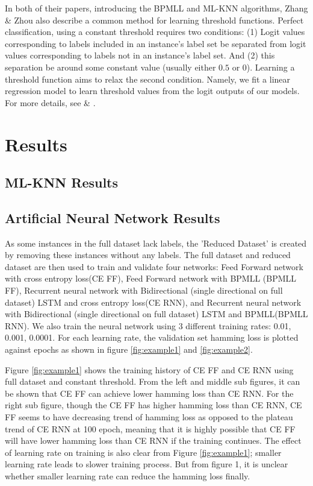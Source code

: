 \documentclass[11pt]{article}
\begin{document}
In both of their papers, introducing the BPMLL and ML-KNN algorithms, Zhang \& Zhou also describe a common method for learning threshold functions. Perfect classification, using a constant threshold requires two conditions: (1) Logit values corresponding to labels included in an instance's label set  be separated from logit values corresponding to labels not in an instance's label set. And (2) this separation be around some constant value (usually either $0.5$ or $0$). Learning a threshold function aims to relax the second condition. Namely, we fit a linear regression model to learn threshold values from the logit outputs of our models. For more details, see \autocite{bpmll} \& \autocite{ZhangMulti-labelLazy}. 
\section{Results}

\subsection{ML-KNN Results}

\subsection{Artificial Neural Network Results}

As some instances in the full dataset lack labels,  the 'Reduced Dataset' is created by removing these instances without any labels. The full dataset and reduced dataset are then used to train and validate four networks: Feed Forward network with cross entropy loss(CE FF), Feed Forward network with BPMLL (BPMLL FF), Recurrent neural network with Bidirectional (single directional on full dataset) LSTM and  cross entropy loss(CE RNN), and Recurrent neural network with Bidirectional (single directional on full dataset) LSTM and BPMLL(BPMLL RNN). We also train the neural network using 3 different training rates: 0.01, 0.001, 0.0001. For each learning rate, the validation set hamming loss is plotted against epochs as shown in figure \ref{fig:example1} and \ref{fig:example2}.

Figure \ref{fig:example1} shows the training history of CE FF and CE RNN using full dataset and constant threshold. From the left and middle sub figures, it can be shown that CE FF can achieve lower hamming loss than CE RNN. For the right sub figure, though the CE FF has higher hamming loss than CE RNN, CE FF seems to have decreasing trend of hamming loss as opposed to the plateau trend of CE RNN at 100 epoch, meaning that it is highly possible that CE FF will have lower hamming loss than CE RNN if the training continues. The effect of learning rate on training is also clear from Figure \ref{fig:example1}; smaller learning rate leads to slower training process. But from figure 1, it is unclear whether  smaller learning rate can reduce the hamming loss finally.
\end{document}
